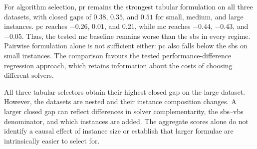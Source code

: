 \begin{table}[htbp]
\begin{minipage}{0.48\textwidth}
  \end{minipage}
  \hfill
  \begin{minipage}{0.48\textwidth}
    \centering

  \end{minipage}
\end{table}
For algorithm selection, \gls{pr} remains the strongest tabular formulation on all three datasets, with closed gaps of $0.38$, $0.35$, and $0.51$ for small, medium, and large instances. \gls{pc} reaches $-0.26$, $0.01$, and $0.21$, while \gls{mc} reaches $-0.44$, $-0.43$, and $-0.05$. Thus, the tested \gls{mc} baseline remains worse than the \gls{sbs} in every regime. Pairwise formulation alone is not sufficient either: \gls{pc} also falls below the \gls{sbs} on small instances. The comparison favours the tested performance-difference regression approach, which retains information about the costs of choosing different solvers.

All three tabular selectors obtain their highest closed gap on the large dataset. However, the datasets are nested and their instance composition changes. A larger closed gap can reflect differences in solver complementarity, the \gls{sbs}--\gls{vbs} denominator, and which instances are added. The aggregate scores alone do not identify a causal effect of instance size or establish that larger formulae are intrinsically easier to select for.
\FloatBarrier

